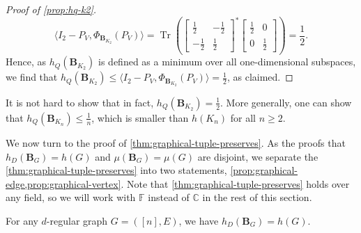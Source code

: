 \documentclass{toc}
\theoremstyle{plain}
\numberwithin{equation}{section}
\theoremstyle{definition}
\DeclareMathOperator{\trace}{Tr}
\newcommand{\tuple}[1]{\mathbf{#1}}
\newcommand{\vB}{\tuple{B}}
\begin{document}
\begin{proof}[Proof of \cref{prop:hq-k2}]
    \[
        \langle I_2-P_V, \Phi_{\vB_{K_2}}(P_V)\rangle = \trace \left(
        \begin{bmatrix}
            \frac 12 & -\frac 12 \\ -\frac 12&\frac 12
        \end{bmatrix}^*
        \begin{bmatrix}
            \frac 12 &0\\0&\frac 12
        \end{bmatrix}
        \right)
        =\frac 12.
    \]
    Hence, as $h_Q(\vB_{K_2})$ is defined as a minimum over all one-dimensional subspaces, we find that $h_Q(\vB_{K_2}) \leq \langle I_2-P_V, \Phi_{\vB_{K_2}}(P_V)\rangle = \frac 12$, as claimed.
\end{proof}

\begin{remark}
It is not hard to show that in fact, $h_Q(\vB_{K_2})=\frac 12$. More generally, one can show that $h_Q(\vB_{K_n})\leq\frac 1n$, which is smaller than $h(K_n)$ for all $n\geq2$. 
\end{remark}
We now turn to the proof of \cref{thm:graphical-tuple-preserves}. As the proofs that $h_D(\vB_G)=h(G)$ and $\mu(\vB_G)=\mu(G)$ are disjoint, we separate the \cref{thm:graphical-tuple-preserves} into two statements, \cref{prop:graphical-edge,prop:graphical-vertex}.
Note that \cref{thm:graphical-tuple-preserves} holds over any field, so we will work with $\mathbb{F}$ instead of $\mathbb{C}$ in the rest of this section. 
\begin{proposition}\label{prop:graphical-edge}
    For any $d$-regular graph $G=([n],E)$, we have $h_D(\vB_G)=h(G)$.
\end{proposition}
\end{document}

